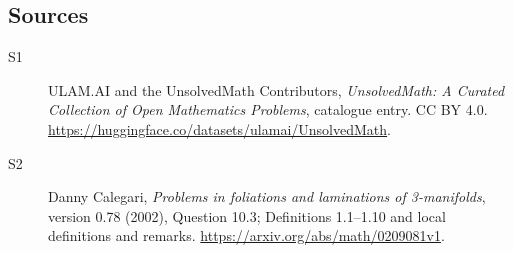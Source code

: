 \documentclass[11pt]{article}
\begin{document}
\subsection{Sources}
\begin{description}
\item[\hypertarget{source:statement:1}{S1}] ULAM.AI and the UnsolvedMath Contributors, \emph{UnsolvedMath: A Curated Collection of Open Mathematics Problems}, catalogue entry. CC BY 4.0. \url{https://huggingface.co/datasets/ulamai/UnsolvedMath}.
\item[\hypertarget{source:statement:2}{S2}] Danny Calegari, \emph{Problems in foliations and laminations of 3-manifolds}, version 0.78 (2002), Question 10.3; Definitions 1.1--1.10 and local definitions and remarks. \url{https://arxiv.org/abs/math/0209081v1}.
\end{description}
\label{end:statement}
\end{document}
